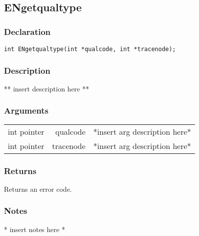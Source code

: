 \subsection{ENgetqualtype}
\subsubsection{Declaration}
\begin{lstlisting}
int ENgetqualtype(int *qualcode, int *tracenode);
\end{lstlisting}
\subsubsection{Description}
** insert description here **
\subsubsection{Arguments}
\begin{tabular}{l r p{11cm} }
int pointer&qualcode&*insert arg description here* \\[6pt]
int pointer&tracenode&*insert arg description here* \\[6pt]
\end{tabular}
\subsubsection{Returns}
Returns an error code.
\subsubsection{Notes}
* insert notes here *